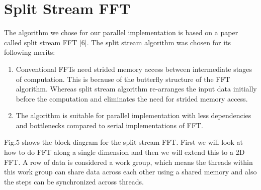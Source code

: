 \documentclass[sigconf]{acmart}
\begin{document}
\section{Split Stream FFT}
The algorithm we chose for our parallel implementation is based on a paper called split stream FFT [6]. The split stream algorithm was chosen for its following merits:
\begin{enumerate}
\item Conventional FFTs need strided memory access between intermediate stages of computation. This is because of the butterfly structure of the FFT algorithm. Whereas split stream algorithm re-arranges the input data initially before the computation and eliminates the need for strided memory access.
\item The algorithm is suitable for parallel implementation with less dependencies and bottlenecks compared to serial implementations of FFT.
\end{enumerate}
Fig.5 shows the block diagram for the split stream FFT. First we will look at how to do FFT along a single dimension and then we will extend this to a 2D FFT. A row of data is considered a work group, which means the threads within this work group can share data across each other using a shared memory and also the steps can be synchronized across threads.
\end{document}
